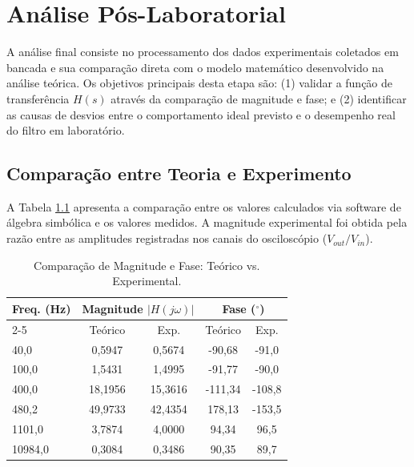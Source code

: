 \chapter{Análise Pós-Laboratorial}

A análise final consiste no processamento dos dados experimentais coletados em bancada e sua comparação direta com o modelo matemático desenvolvido na análise teórica. Os objetivos principais desta etapa são: (1) validar a função de transferência $H(s)$ através da comparação de magnitude e fase; e (2) identificar as causas de desvios entre o comportamento ideal previsto e o desempenho real do filtro em laboratório.

\section{Comparação entre Teoria e Experimento}

A Tabela \ref{tab:comparacao_resultados} apresenta a comparação entre os valores calculados via software de álgebra simbólica e os valores medidos. A magnitude experimental foi obtida pela razão entre as amplitudes registradas nos canais do osciloscópio ($V_{out}/V_{in}$).

\begin{table}[H]
	\centering
	\ABNTEXfontereduzida
	\caption{Comparação de Magnitude e Fase: Teórico vs. Experimental.}
	\label{tab:comparacao_resultados}
	\begin{tabular}{l|c|c|c|c}
		\hline
		\multirow{2}{*}{\textbf{Freq. (Hz)}} & \multicolumn{2}{c|}{\textbf{Magnitude $|H(j\omega)|$}} & \multicolumn{2}{c}{\textbf{Fase ($^\circ$)}} \\ \cline{2-5}
		& Teórico & Exp. & Teórico & Exp. \\ \hline
		40,0      & 0,5947  & 0,5674  & -90,68  & -91,0  \\ [3pt]
		100,0     & 1,5431  & 1,4995  & -91,77  & -90,0  \\ [3pt]
		400,0     & 18,1956 & 15,3616 & -111,34 & -108,8 \\ [3pt]
		480,2     & 49,9733 & 42,4354 & 178,13  & -153,5 \\ [3pt]
		1101,0    & 3,7874  & 4,0000  & 94,34   & 96,5   \\ [3pt]
		10984,0   & 0,3084  & 0,3486  & 90,35   & 89,7   \\ [3pt]
		\hline
	\end{tabular}
\end{table}

